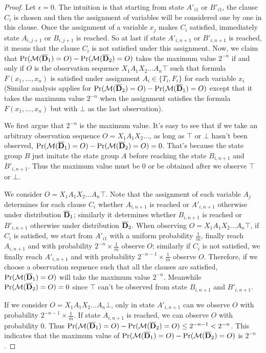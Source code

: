 \begin{proof}
  Let $\epsilon=0$. The intuition is that starting from state $A'_{i1}$ or $B'_{i1}$,
  the clause $C_i$ is chosen and then the assignment of variables will be considered one by one
  in this clause. Once the assignment of a variable $x_j$ makes $C_i$ satisfied, immediately
  state $A_{i,j+1}$ or $B_{i,j+1}$ is reached. So at last if state $A'_{i,n+1}$ or $B'_{i,n+1}$
  is reached, it means that the clause $C_i$ is not satisfied under this assignment. Now, we claim
  that  $\Pr (\mathcal{M} (\overline{\mathbf{D}}_1) = O) - \Pr (\mathcal{M} (\overline{\mathbf{D}}_2) = O)$ takes the maximum value $2^{-n}$
  if and only if $O$ is the observation sequence $X_1A_1X_2\ldots A_n \top$ such that
  formula $F(x_1,\ldots,x_n)$ is satisfied under assignment $A_i \in \{T_i,F_i\}$ for each variable $x_i$
  (Similar analysis applies for $\Pr (\mathcal{M} (\overline{\mathbf{D}}_2) = O) - \Pr (\mathcal{M} (\overline{\mathbf{D}}_1) = O)$ except that it takes the
   maximum value $2^{-n}$ when the assignment satisfies the formula $F(x_1,\ldots,x_n)$ but with $\bot$
   as the last observation).

  We first argue that $2^{-n}$ is the maximum value.
  It's easy to see that if we take an arbitrary observation sequence $O = X_1A_1X_2\ldots $,
  as long as $\top$ or $\bot$ hasn't been observed, $\Pr (\mathcal{M} (\overline{\mathbf{D}}_1) = O) - \Pr (\mathcal{M} (\overline{\mathbf{D}}_2) = O) = 0$.
  That's because the state group $B$ just imitate the state group $A$ before reaching the state
  $B_{i,n+1}$ and $B'_{i,n+1}$. Thus the maximum value must be 0 or be obtained after we observe $\top$
  or $\bot$. 
  
  We consider $O=X_1A_1X_2\ldots A_n \top$. Note that the assignment of each variable $A_j$
  determines for each clause $C_i$ whether $A_{i,n+1}$ is reached or $A'_{i,n+1}$ otherwise under
  distribution $\overline{\mathbf{D}}_1$; similarly it determines whether $B_{i,n+1}$ is reached or $B'_{i,n+1}$ otherwise under
  distribution $\overline{\mathbf{D}}_2$. When observing $O=X_1A_1X_2\ldots A_n \top$, if $C_i$ is satisfied, we start from $A'_{i1}$ with a 
  uniform probability $\frac{1}{m}$, finally reach $A_{i,n+1}$ and with probability $2^{-n} \times \frac{1}{m}$ observe $O$;
  similarly if $C_i$ is not satisfied, we finally reach $A'_{i,n+1}$ and with probability $2^{-n-1}\times \frac{1}{m}$ observe $O$.
  Therefore, if we choose a observation sequence such that all the 
  clauses are satisfied, $\Pr (\mathcal{M} (\overline{\mathbf{D}}_1) = O)$ will take the maximum value $2^{-n}$. 
  Meanwhile $\Pr (\mathcal{M} (\overline{\mathbf{D}}_2) = O)=0$ since $\top$ can't be observed from state $B_{i,n+1}$ and $B'_{i,n+1}$.
  
  If we consider $O=X_1A_1X_2\ldots A_n \bot$, only in state $A'_{i,n+1}$ can we observe $O$ with
  probability $2^{-n-1} \times \frac{1}{m}$. If state $A_{i,n+1}$ is reached, we can observe $O$ with probability 0.
  Thus $\Pr (\mathcal{M} (\overline{\mathbf{D}}_1) = O) - \Pr (\mathcal{M} (\overline{\mathbf{D}}_2) = O) \leq 2^{-n-1} < 2^{-n}$. This indicates that
  the maximum value of $\Pr (\mathcal{M} (\overline{\mathbf{D}}_1) = O) - \Pr (\mathcal{M} (\overline{\mathbf{D}}_2) = O)$ is $2^{-n}$.
  

\end{proof}
